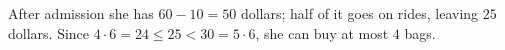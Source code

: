 After admission she has $60-10=50$ dollars; half of it goes on rides, leaving $25$ dollars. Since $4\cdot6=24\le25<30=5\cdot6$, she can buy at most $\boxed{4}$ bags.
